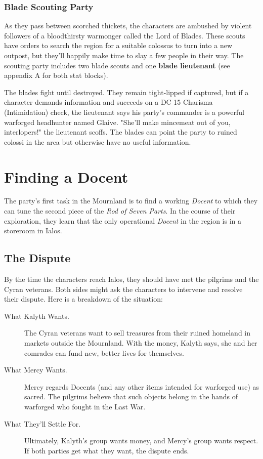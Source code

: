 \documentclass[10pt,a4paper,twoside,bg=print,twocolumn,openany,nodeprecatedcode]{dndbook}
\begin{document}
\subsubsection{Blade Scouting Party}
As they pass between scorched thickets, the characters are ambushed by violent followers of a bloodthirsty warmonger called the Lord of Blades. These scouts have orders to search the region for a suitable colossus to turn into a new outpost, but they'll happily make time to slay a few people in their way. The scouting party includes two blade scouts and one \textbf{blade lieutenant} (see appendix A for both stat blocks).

The blades fight until destroyed. They remain tight-lipped if captured, but if a character demands information and succeeds on a DC 15 Charisma (Intimidation) check, the lieutenant says his party's commander is a powerful warforged headhunter named Glaive. "She'll make mincemeat out of you, interlopers!" the lieutenant scoffs. The blades can point the party to ruined colossi in the area but otherwise have no useful information.

\section{Finding a Docent}
The party's first task in the Mournland is to find a working \textit{Docent} to which they can tune the second piece of the \textit{Rod of Seven Parts}. In the course of their exploration, they learn that the only operational \textit{Docent} in the region is in a storeroom in Ialos.

\subsection{The Dispute}
By the time the characters reach Ialos, they should have met the pilgrims and the Cyran veterans. Both sides might ask the characters to intervene and resolve their dispute. Here is a breakdown of the situation:


\begin{description}
\item[What Kalyth Wants.]
The Cyran veterans want to sell treasures from their ruined homeland in markets outside the Mournland. With the money, Kalyth says, she and her comrades can fund new, better lives for themselves.
\item[What Mercy Wants.]
Mercy regards Docents (and any other items intended for warforged use) as sacred. The pilgrims believe that such objects belong in the hands of warforged who fought in the Last War.
\item[What They'll Settle For.]
Ultimately, Kalyth's group wants money, and Mercy's group wants respect. If both parties get what they want, the dispute ends.
\end{description}
\end{document}
